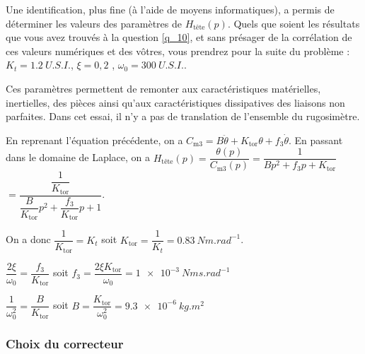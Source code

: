 \vspace{.25cm}

Une identification, plus fine (à l’aide de moyens informatiques), a permis de déterminer les valeurs des
paramètres de $H_{\text{tête}}(p)$. Quels que soient les résultats que vous avez trouvés à la question \ref{q_10}, et sans
présager de la corrélation de ces valeurs numériques et des vôtres, vous prendrez pour la suite du
problème : $K_t =\SI{1,2}{U.S.I.}$, $\xi = 0,2$ , $\omega_0 = \SI{300}{U.S.I.}$.


Ces paramètres permettent de remonter aux caractéristiques matérielles, inertielles, des pièces ainsi qu’aux
caractéristiques dissipatives des liaisons non parfaites. Dans cet essai, il n’y a pas de translation de
l’ensemble du rugosimètre.
\fi



\ifprof
\begin{corrige}
En reprenant l'équation précédente, on a $ C_{\text{m3}} = B\ddot{\theta}  + K_{\text{tor}}\theta+ f_3 \dot{\theta}   $.
En passant dans le domaine de Laplace, on a $H_{\text{tête}}(p) = \dfrac{\theta(p)}{C_{\text{m3}}(p)} = \dfrac{1}{Bp^2+f_3p+K_{\text{tor}}}$ $= \dfrac{\dfrac{1}{K_{\text{tor}}}}{\dfrac{B}{K_{\text{tor}}}p^2+\dfrac{f_3}{K_{\text{tor}}}p+1}$.

On a donc $\dfrac{1}{K_{\text{tor}}} = K_t$ soit $K_{\text{tor}}=\dfrac{1}{K_t} = \SI{0,83}{Nm.rad^{-1}}$. 

$\dfrac{2\xi}{\omega_0} = \dfrac{f_3}{K_{\text{tor}}}$ soit $f_3 = \dfrac{2\xi K_{\text{tor}} }{\omega_0} = \SI{1e-3}{Nms.rad^{-1}}$

$\dfrac{1}{\omega_0^2} = \dfrac{B}{K_{\text{tor}}}$ soit $B=\dfrac{K_{\text{tor}}}{\omega_0^2 } = \SI{9,3e-6}{kg.m^2}$
\end{corrige}
\else
\fi

\subsubsection{Choix du correcteur}

